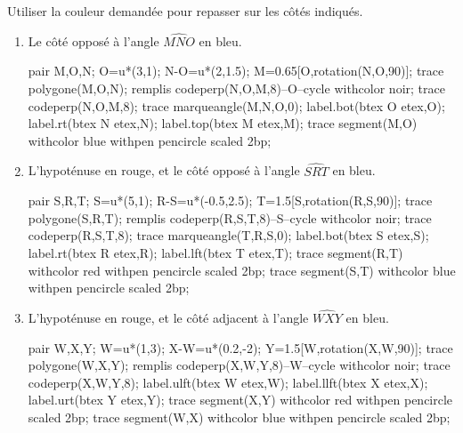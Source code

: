 \begin{corrige}
    Utiliser la couleur demandée pour repasser sur les côtés indiqués.
    \begin{enumerate}
        \item Le côté opposé à l'angle $\widehat{MNO}$ en bleu.
        
        \medskip        
        \begin{Geometrie}[CoinHD={(6u,4.5u)}]        
            pair M,O,N;
            O=u*(3,1);
            N-O=u*(2,1.5);
            M=0.65[O,rotation(N,O,90)];
            trace polygone(M,O,N);
            remplis codeperp(N,O,M,8)--O--cycle withcolor noir;
            trace codeperp(N,O,M,8);        
            trace marqueangle(M,N,O,0);
            label.bot(btex O etex,O);
            label.rt(btex N etex,N);
            label.top(btex M etex,M);
            trace segment(M,O) withcolor blue withpen pencircle scaled 2bp;
        \end{Geometrie}
        \item L'hypoténuse en rouge, et le côté opposé à l'angle $\widehat{SRT}$ en bleu.
        
        \medskip        
        \begin{Geometrie}[CoinHD={(6u,4.5u)}]        
            pair S,R,T;
            S=u*(5,1);
            R-S=u*(-0.5,2.5);
            T=1.5[S,rotation(R,S,90)];
            trace polygone(S,R,T);
            remplis codeperp(R,S,T,8)--S--cycle withcolor noir;
            trace codeperp(R,S,T,8);        
            trace marqueangle(T,R,S,0);
            label.bot(btex S etex,S);
            label.rt(btex R etex,R);
            label.lft(btex T etex,T);
            trace segment(R,T) withcolor red withpen pencircle scaled 2bp;
            trace segment(S,T) withcolor blue withpen pencircle scaled 2bp;
        \end{Geometrie}
        \item L'hypoténuse en rouge, et le côté adjacent à l'angle $\widehat{WXY}$ en bleu.
        
        \medskip        
        \begin{Geometrie}[CoinHD={(6u,4.5u)}]        
            pair W,X,Y;
            W=u*(1,3);
            X-W=u*(0.2,-2);
            Y=1.5[W,rotation(X,W,90)];
            trace polygone(W,X,Y);
            remplis codeperp(X,W,Y,8)--W--cycle withcolor noir;
            trace codeperp(X,W,Y,8);
            label.ulft(btex W etex,W);
            label.llft(btex X etex,X);
            label.urt(btex Y etex,Y);
            trace segment(X,Y) withcolor red withpen pencircle scaled 2bp;
            trace segment(W,X) withcolor blue withpen pencircle scaled 2bp;
        \end{Geometrie}
    \end{enumerate}
\end{corrige}

